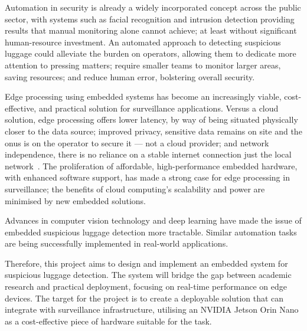 Automation in security is already a widely incorporated concept across the
public sector, with systems such as facial recognition and intrusion detection
providing results that manual monitoring alone cannot achieve; at least without
significant human-resource investment. An automated approach to detecting
suspicious luggage could alleviate the burden on operators, allowing them to
dedicate more attention to pressing matters; require smaller teams to monitor
larger areas, saving resources; and reduce human error, bolstering overall
security.

Edge processing using embedded systems has become an increasingly viable,
cost-effective, and practical solution for surveillance applications. Versus a
cloud solution, edge processing offers lower latency, by way of being situated
physically closer to the data source; improved privacy, sensitive data remains
on site and the onus is on the operator to secure it --- not a cloud provider;
and network independence, there is no reliance on a stable internet connection
just the local network~\citep{pamadi2025edgevscloud}. The proliferation of
affordable, high-performance embedded hardware, with enhanced software support,
has made a strong case for edge processing in surveillance; the benefits of
cloud computing's scalability and power are minimised by new embedded
solutions.

Advances in computer vision technology and deep learning have made the issue of
embedded suspicious luggage detection more tractable. Similar automation tasks
are being successfully implemented in real-world applications.

Therefore, this project aims to design and implement an embedded system for
suspicious luggage detection. The system will bridge the gap between academic
research and practical deployment, focusing on real-time performance on edge
devices. The target for the project is to create a deployable solution that can
integrate with surveillance infrastructure, utilising an NVIDIA Jetson Orin
Nano as a cost-effective piece of hardware suitable for the task.

